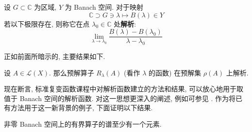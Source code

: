 \begin{Definition}
\label{def:banach-valued-analytic-function}
设 $G\subset\mathbb{C}$ 为区域, $Y$ 为 Banach 空间. 对于映射
\begin{equation}\label{eq:banach-valued-complex-function-map}
\mathbb{C}\supset G\ni\lambda\mapsto B(\lambda)\in Y
\end{equation}
若以下极限存在, 则称它在点 $\lambda_0\in\mathbb{C}$ 处\textbf{解析}:
\begin{equation}\label{eq:banach-valued-analytic-function-difference-quotient}
\lim_{\lambda\to\lambda_0}\dfrac{B(\lambda)-B(\lambda_0)}{\lambda-\lambda_0}
\end{equation}

\end{Definition}

正如前面所暗示的, 主要结果如下.

\begin{Theorem}
\label{thm:bounded-operator-analytic-resolvent}
设 $A\in\mathcal{L}(X)$. 那么预解算子 $R_\lambda(A)$ (看作 $\lambda$ 的函数) 在预解集 $\rho(A)$ 上解析.
\end{Theorem}

\begingroup
{}
\renewcommand{\endProof}{\par\nobreak\hfill$\blacksquare$\par\vspace{0.1cm}}
\endgroup

现在断言, 标准复变函数课程中对解析函数建立的方法和结果, 可以放心地用于取值于 Banach 空间的解析函数. 对这一思想更深入的阐述, 例如可参见 \cite{DS}. 作为将已有方法用于这一新背景的例子, 下面证明以下结果.

\begin{Theorem}
\label{thm:bounded-operator-nonempty-spectrum}
非零 Banach 空间上的有界算子的谱至少有一个元素.
\end{Theorem}

\begingroup
{}
\renewcommand{\endProof}{\par\nobreak\hfill$\blacksquare$\par\vspace{0.1cm}}
\endgroup

